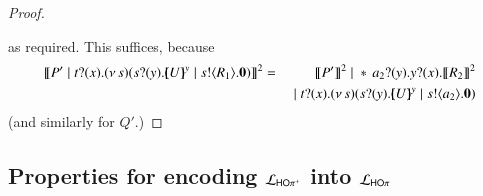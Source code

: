 \begin{proof}
		{}
		{ \Par \repl {}   \Par {} }
		{\Re}
		{}
		{}
		{ \Par \repl {}   \Par {} }

	\noi as required.
	This suffices, because
	\begin{eqnarray*}
		 \pmap{P' \Par \binp{t}{x} \newsp{s}{ \binp{s}{y} \mapchar{U}{y} \Par \bout{s}{R_1} \inact}}{2} & = &
		\pmap{P'}{2} \Par \repl \binp{a_2}{y} \binp{y}{x} \pmap{R_2}{2} \\
		&  & \Par \binp{t}{x} \newsp{s}{ \binp{s}{y} \mapchar{U}{y} \Par \bout{s}{a_2} \inact}
	\end{eqnarray*}
	(and similarly for $Q'$.)
\end{proof}




%



\subsection{Properties for encoding $\mathcal{L}_{\mathsf{HO\pi^{+}}}$ into $\mathcal{L}_{\mathsf{HO}\pi}$}
\label{app:HOpp_to_HOp}

